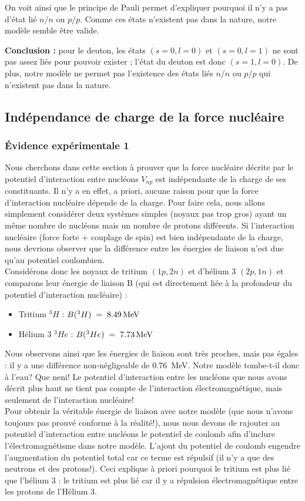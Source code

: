 On voit ainsi que le principe de Pauli permet d'expliquer pourquoi il n'y a pas d'état lié $n/n$ ou $p/p$. Comme ces états n'existent pas dans la nature, notre modèle semble être valide.

\textbf{Conclusion :} pour le deuton, les états $(s=0,l=0)$ et $(s=0,l=1)$ ne sont pas assez liés pour pouvoir exister ; l'état du deuton est donc $(s=1,l=0)$. De plus, notre modèle ne permet pas l'existence des états liés $n/n$ ou $p/p$ qui n'existent pas dans la nature.


\subsection{Indépendance de charge de la force nucléaire}
\subsubsection{Évidence expérimentale 1}

Nous cherchons dans cette section à prouver que la force nucléaire décrite par le potentiel d'interaction entre nucléons $V_{np}$ est indépendante de la charge de ses constituants. Il n'y a en effet, a priori, aucune raison pour que la force d'interaction nucléaire dépende de la charge. Pour faire cela, nous allons simplement considérer deux systèmes simples (noyaux pas trop gros) ayant un même nombre de nucléons mais un nombre de protons différents. Si l'interaction nucléaire (force forte + couplage de spin) est bien indépendante de la charge, nous devrions observer que la différence entre les énergies de liaison n'est due qu'au potentiel coulombien.\\

Considérons donc les noyaux de tritium $(1p,2n)$ et d'hélium 3 $(2p,1n)$ et comparons leur énergie de liaison B (qui est directement liée à la profondeur du potentiel d'interaction nucléaire) :
\begin{itemize}
    \item Tritium $^3H$ : $B(^3H) \; = \; \SI{8.49}{MeV}$
    \item Hélium 3 $^3He$ : $B(^3He) \; = \; \SI{7.73}{MeV}$
\end{itemize}
Nous observons ainsi que les énergies de liaison sont très proches, mais pas égales : il y a une différence non-négligeable de \SI{0.76}{MeV}. Notre modèle tombe-t-il donc à l'eau? Que neni! Le potentiel d'interaction entre les nucléons que nous avons décrit plus haut ne tient pas compte de l'interaction électromagnétique, mais seulement de l'interaction nucléaire!\\
Pour obtenir la véritable énergie de liaison avec notre modèle (que nous n'avons toujours pas prouvé conforme à la réalité!), nous nous devons de rajouter au potentiel d'interaction entre nucléons le potentiel de coulomb afin d'inclure l'électromagnétisme dans notre modèle. L'ajout du potentiel de coulomb engendre l'augmentation du potentiel total car ce terme est répulsif (il n'y a que des neutrons et des protons!). Ceci explique à priori pourquoi le tritium est plus lié que l'hélium 3 : le tritium est plus lié car il y a répulsion électromagnétique entre les protons de l'Hélium 3.\\

